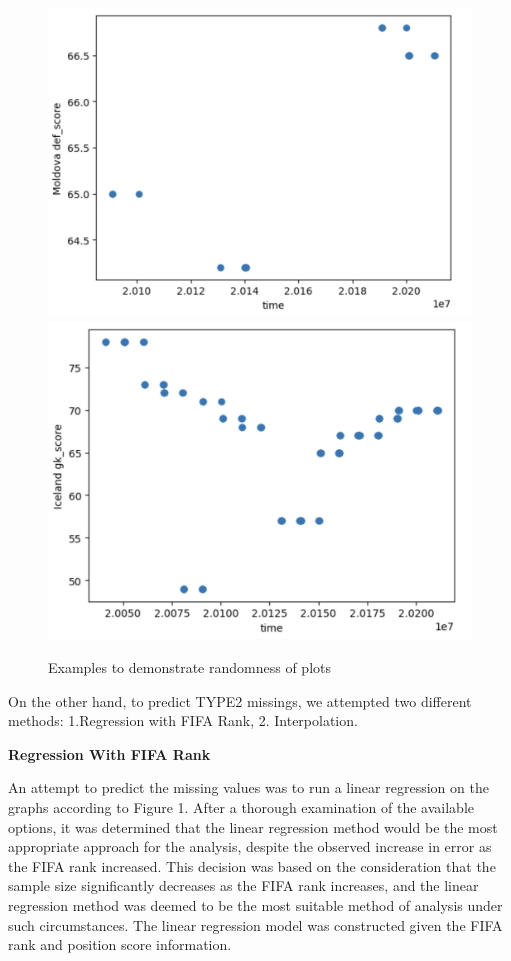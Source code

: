 \documentclass[8pt]{article}
\begin{document}
\begin{figure}[H]
    \includegraphics[scale=.3]{mol_def_values.png}
    \includegraphics[scale=.3]{ice_gk_values.png}
    \caption{Examples to demonstrate randomness of plots}
    \label{fig:posscores}
\end{figure}
On the other hand, to predict TYPE2 missings, we attempted two different methods: 1.Regression with FIFA Rank, 2. Interpolation.

\textbf{Regression With FIFA Rank}\vspace{0.05cm}

An attempt to predict the missing values was to run a linear regression on the graphs according to Figure 1. After a thorough examination of the available options, it was determined that the linear regression method would be the most appropriate approach for the analysis, despite the observed increase in error as the FIFA rank increased. This decision was based on the consideration that the sample size significantly decreases as the FIFA rank increases, and the linear regression method was deemed to be the most suitable method of analysis under such circumstances. The linear regression model was constructed given the FIFA rank and position score information.
\end{document}
